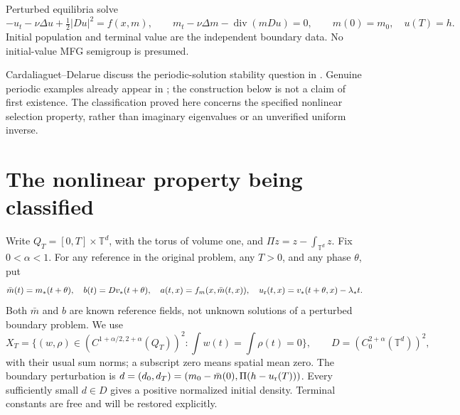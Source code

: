 \documentclass[11pt,a4paper]{article}
\begin{document}
Perturbed equilibria solve
\[
 -u_t-\nu\Delta u+\tfrac12|Du|^2=f(x,m),\qquad
 m_t-\nu\Delta m-\operatorname{div}(mDu)=0,
 \qquad m(0)=m_0,\quad u(T)=h.
\]
Initial population and terminal value are the independent boundary
data. No initial-value MFG semigroup is presumed.

Cardaliaguet--Delarue discuss the periodic-solution stability question
in \cite[Section 3.3, paragraph ``Periodic solutions,'' p.~3681]{CD}.
Genuine periodic examples already appear in
\cite[Section 6, Theorem 6.1 and Remark 6.4]{CN}; the construction
below is not a claim of first existence. The classification proved
here concerns the specified nonlinear selection property, rather
than imaginary eigenvalues or an unverified uniform inverse.

\section{The nonlinear property being classified}
Write $Q_T=[0,T]\times\mathbb T^d$, with the torus of volume one, and
$\Pi z=z-\int_{\mathbb T^d}z$. Fix $0<\alpha<1$.
For any reference in the original problem, any $T>0$, and any phase
$\theta$, put
\[
 \bar m(t)=m_*(t+\theta),\quad b(t)=Dv_*(t+\theta),\quad
 a(t,x)=f_m(x,\bar m(t,x)),\quad
 u_{\rm r}(t,x)=v_*(t+\theta,x)-\lambda_*t.
\]
Both $\bar m$ and $b$ are known reference fields, not unknown solutions
of a perturbed boundary problem. We use
\[
 X_T=\{(w,\rho)\in(C^{1+\alpha/2,2+\alpha}(Q_T))^2:
                  \textstyle\int w(t)=\int\rho(t)=0\},\qquad
 D=(C^{2+\alpha}_0(\mathbb T^d))^2,
\]
with their usual sum norms; a subscript zero means spatial mean zero.
The boundary perturbation is
$d=(d_0,d_T)=(m_0-\bar m(0),\Pi(h-u_{\rm r}(T)))$.
Every sufficiently small $d\in D$ gives a positive normalized initial
density. Terminal constants are free and will be restored explicitly.
\end{document}

